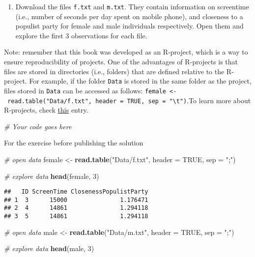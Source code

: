\documentclass[
]{book}
\newenvironment{Shaded}{\begin{snugshade}}{\end{snugshade}}
\newcommand{\AttributeTok}[1]{\textcolor[rgb]{0.13,0.29,0.53}{#1}}
\newcommand{\CommentTok}[1]{\textcolor[rgb]{0.56,0.35,0.01}{\textit{#1}}}
\newcommand{\ConstantTok}[1]{\textcolor[rgb]{0.56,0.35,0.01}{#1}}
\newcommand{\DecValTok}[1]{\textcolor[rgb]{0.00,0.00,0.81}{#1}}
\newcommand{\FunctionTok}[1]{\textcolor[rgb]{0.13,0.29,0.53}{\textbf{#1}}}
\newcommand{\NormalTok}[1]{#1}
\newcommand{\OtherTok}[1]{\textcolor[rgb]{0.56,0.35,0.01}{#1}}
\newcommand{\StringTok}[1]{\textcolor[rgb]{0.31,0.60,0.02}{#1}}
\providecommand{\tightlist}{%
  \setlength{\itemsep}{0pt}\setlength{\parskip}{0pt}}
\begin{document}
\begin{enumerate}
\def\labelenumi{\arabic{enumi}.}
\tightlist
\item
  Download the files \texttt{f.txt} and \texttt{m.txt}. They contain information on screentime (i.e., number of seconds per day spent on mobile phone), and closeness to a populist party for female and male individuals respectively. Open them and explore the first 3 observations for each file.
\end{enumerate}

Note: remember that this book was developed as an R-project, which is a way to ensure reproducibility of projects. One of the advantages of R-projects is that files are stored in directories (i.e., folders) that are defined relative to the R-project. For example, if the folder \texttt{Data} is stored in the same folder as the project, files stored in \texttt{Data} can be accessed as follows: \texttt{female\ \textless{}-\ read.table("Data/f.txt",\ header\ =\ TRUE,\ sep\ =\ "\textbackslash{}t")}.To learn more about R-projects, check \href{https://rfortherestofus.com/2022/10/rstudio-projects}{this} entry.

\begin{Shaded}
\begin{Highlighting}[]
\CommentTok{\# Your code goes here}
\end{Highlighting}
\end{Shaded}

{For the exercise before publishing the solution}

\begin{Shaded}
\begin{Highlighting}[]
\CommentTok{\# open data}
\NormalTok{female }\OtherTok{\textless{}{-}} \FunctionTok{read.table}\NormalTok{(}\StringTok{"Data/f.txt"}\NormalTok{, }\AttributeTok{header =} \ConstantTok{TRUE}\NormalTok{, }\AttributeTok{sep =} \StringTok{";"}\NormalTok{)}

\CommentTok{\# explore data}
\FunctionTok{head}\NormalTok{(female, }\DecValTok{3}\NormalTok{)}
\end{Highlighting}
\end{Shaded}

\begin{verbatim}
##   ID ScreenTime ClosenessPopulistParty
## 1  3      15000               1.176471
## 2  4      14861               1.294118
## 3  5      14861               1.294118
\end{verbatim}

\begin{Shaded}
\begin{Highlighting}[]
\CommentTok{\# open data}
\NormalTok{male }\OtherTok{\textless{}{-}} \FunctionTok{read.table}\NormalTok{(}\StringTok{"Data/m.txt"}\NormalTok{, }\AttributeTok{header =} \ConstantTok{TRUE}\NormalTok{, }\AttributeTok{sep =} \StringTok{";"}\NormalTok{)}

\CommentTok{\# explore data}
\FunctionTok{head}\NormalTok{(male, }\DecValTok{3}\NormalTok{)}
\end{Highlighting}
\end{Shaded}
\end{document}
